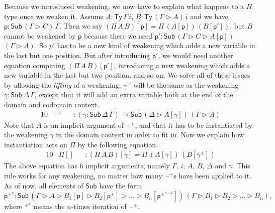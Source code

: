 \documentclass[submission,copyright,creativecommons]{eptcs}
\newcommand{\ra}{\rightarrow}
\newcommand{\Ty}{\mathsf{Ty}}
\newcommand{\Sub}{\mathsf{Sub}}
\newcommand{\p}{\mathsf{p}}
\newcommand{\ext}{\mathop{\triangleright}}
\newcommand{\blank}{\mathord{\hspace{1pt}\text{--}\hspace{1pt}}} %
\begin{document}
Because we introduced weakening, we now have to explain what happens
to a $\Pi$ type once we weaken it. Assume $A : \Ty\,\Gamma\,i$,
$B:\Ty\,(\Gamma\ext A)\,i$ and we have $\p:\Sub\,(\Gamma\ext
C)\,\Gamma$. Then we say $(\Pi\,A\,B)[\p] = \Pi\,(A[\p])\,(B[\p'])$,
but $B$ cannot be weakened by $\p$ because there we need $\p' :
\Sub\,(\Gamma\ext C\ext A[\p])$ $(\Gamma\ext A)$. So $p'$ has to be a %
new kind of weakening which adds a new variable in the last but one
position. But after introducing $\p'$, we would need another equation computing $(\Pi\,A\,B)[\p']$,
introducing a new weakening which adds a new variable in the last but
two position, and so on. We solve all of these issues by allowing the
\emph{lifting} of a weakening: $\gamma^+$ will be the same as the
weakening $\gamma : \Sub\,\Delta\,\Gamma$, except that it will add an
extra variable both at the end of the domain and codomain
context.
\begin{alignat*}{10}
& \blank^+ && : (\gamma:\Sub\,\Delta\,\Gamma)\ra\Sub\,(\Delta\ext A[\gamma])\,(\Gamma\ext A)
\end{alignat*}
Note that $A$ is an implicit argument of $\blank^+$, and that it has
to be instantiated by the weakening $\gamma$ in the domain context in
order to fit in. Now we explain how instantiation acts on $\Pi$ by
the following equation.
\begin{alignat*}{10}
& \Pi[] && : (\Pi\,A\,B)[\gamma] = \Pi\,(A[\gamma])\,(B[\gamma^+])
\end{alignat*}
The above equation has 6 implicit arguments, namely $\Gamma$, $i$,
$A$, $B$, $\Delta$ and $\gamma$.  This rule works for any weakening,
no matter how many $\blank^+$s have been applied to it. As of now, all
elements of $\Sub$ have the form
$
\p^{+^n} : \Sub\,(\Gamma\ext A\ext B_1[\p]\ext B_2[\p^+]\ext\dots\ext B_n[\p^{+^{n-1}}])\,(\Gamma\ext B_1\ext B_2\ext\dots\ext B_n),
$
where $^{+^n}$ means the $n$-times iteration of $\blank^+$.
\end{document}
